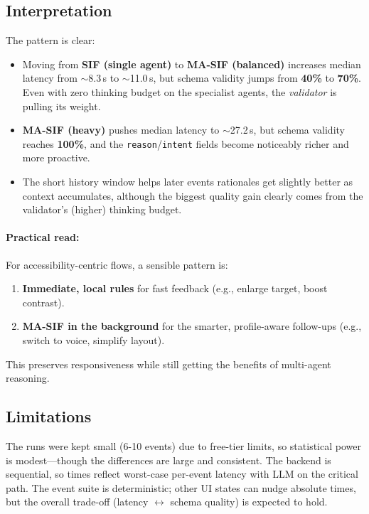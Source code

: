 \documentclass[openany]{book}
\begin{document}
\subsection*{Interpretation}
The pattern is clear:
\begin{itemize}
    \item Moving from \textbf{SIF (single agent)} to \textbf{MA\mbox{-}SIF (balanced)} increases median latency from $\sim$8.3\,s to $\sim$11.0\,s, but schema validity jumps from \textbf{40\%} to \textbf{70\%}. Even with zero thinking budget on the specialist agents, the \emph{validator} is pulling its weight.
    \item \textbf{MA\mbox{-}SIF (heavy)} pushes median latency to $\sim$27.2\,s, but schema validity reaches \textbf{100\%}, and the \texttt{reason}/\texttt{intent} fields become noticeably richer and more proactive.
    \item The short history window helps later events rationales get slightly better as context accumulates, although the biggest quality gain clearly comes from the validator’s (higher) thinking budget.
\end{itemize}

\paragraph{Practical read:} For accessibility-centric flows, a sensible pattern is:
\begin{enumerate}
    \item \textbf{Immediate, local rules} for fast feedback (e.g., enlarge target, boost contrast).
    \item \textbf{MA-SIF in the background} for the smarter, profile-aware follow-ups (e.g., switch to voice, simplify layout).
\end{enumerate}
This preserves responsiveness while still getting the benefits of multi-agent reasoning.

\subsection*{Limitations}
The runs were kept small (6-10 events) due to free-tier limits, so statistical power is modest—though the differences are large and consistent. The backend is sequential, so times reflect worst-case per-event latency with LLM on the critical path. The event suite is deterministic; other UI states can nudge absolute times, but the overall trade-off (latency $\leftrightarrow$ schema quality) is expected to hold.
\end{document}
